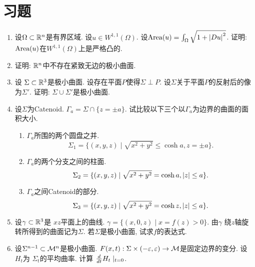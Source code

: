 \chapter{习题}
\begin{enumerate}
    \item 设$\Omega\subset \mathbb{R}^n$是有界区域. 设$u \in W^{1,1}(\Omega)$.  设$\text{Area}(u)=\int_\Omega \sqrt{1+\left | Du \right |^2}$. 证明: $\text{Area}(u)$在$W^{1,1}(\Omega)$上是严格凸的.
    \item 证明: $\mathbb{R}^n$中不存在紧致无边的极小曲面.
    \item 设 $\Sigma \subset \mathbb{R}^3$是极小曲面. 设存在平面$P$使得$\Sigma \perp P$. 设$\Sigma$关于平面$P$的反射后的像为$\Sigma'$. 证明: $\Sigma \cup \Sigma'$是极小曲面.
    \item 设$\Sigma$为Catenoid. $\Gamma_a=\Sigma \cap \{z=\pm a\}$. 试比较以下三个以$\Gamma_a$为边界的曲面的面积大小.
    \begin{enumerate}
        \item $\Gamma_a$所围的两个圆盘之并.  
        \begin{equation*}
            \Sigma_1=\{(x,y,z)\mid \sqrt{x^2+y^2} \le \cosh a, z=\pm a\}.
        \end{equation*}
        \item $\Gamma_a$的两个分支之间的柱面. 
        \begin{equation*}
            \Sigma_2=\{(x,y,z)\mid \sqrt{x^2+y^2} = \cosh a, \left | z \right | \le a\}.
        \end{equation*}
        \item $\Gamma_a$之间Catenoid的部分. 
        \begin{equation*}
            \Sigma_3=\{(x,y,z)\mid  \sqrt{x^2+y^2}=\cosh z, \left | z \right | \le a \}.
        \end{equation*}
    \end{enumerate}
    \item 设$\gamma\subset \mathbb{R}^3$是 $xz$平面上的曲线. $\gamma= \{(x,0,z)\mid x=f(z) >0 \}$. 由$\gamma$ 绕$z$轴旋转所得到的曲面记为$\Sigma$. 若$\Sigma$是极小曲面, 试求$f$的表达式.
    \item 设$\Sigma^{n-1} \subset {\mathcal{M}}^n$是极小曲面. $F(x,t): \Sigma \times (-\varepsilon, \varepsilon)\to {\mathcal{M}}$是固定边界的变分. 设$H_t$为 $\Sigma_t$的平均曲率. 计算 $\frac{d}{dt} H_t \mid _{t=0}$.

\end{enumerate}
